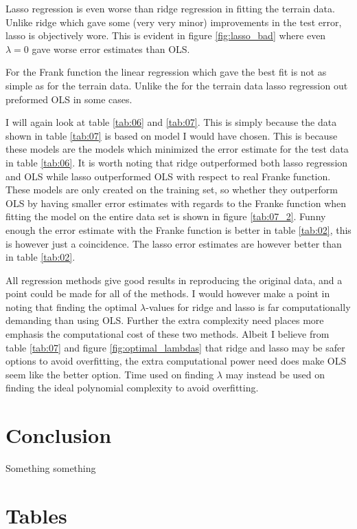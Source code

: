 \documentclass[uio,jmp,amsmath,amssymb,reprint,nofootinbib]{revtex4-1}
\numberwithin{equation}{section}
\begin{document}
Lasso regression is even worse than ridge regression in fitting the terrain data. Unlike ridge which gave some (very very minor) improvements in the test error, lasso is objectively wore. This is evident in figure \ref{fig:lasso_bad} where even \(\lambda = 0\) gave worse error estimates than OLS.

For the Frank function the linear regression which gave the best fit is not as simple as for the terrain data. Unlike the for the terrain data lasso regression out preformed OLS in some cases.

I will again look at table \ref{tab:06} and \ref{tab:07}. This is simply because the data shown in table \ref{tab:07} is based on model I would have chosen. This is because these models are the models which minimized the error estimate for the test data in table \ref{tab:06}. It is worth noting that ridge outperformed both lasso regression and OLS while lasso outperformed OLS with respect to real Franke function. These models are only created on the training set, so whether they outperform OLS by having smaller error estimates with regards to the Franke function when fitting the model on the entire data set is shown in figure \ref{tab:07_2}. Funny enough the error estimate with the Franke function is better in table \ref{tab:02}, this is however just a coincidence. The lasso error estimates are however better than in table \ref{tab:02}.

All regression methods give good results in reproducing the original data, and a point could be made for all of the methods. I would however make a point in noting that finding the optimal \(\lambda\)-values for ridge and lasso is far computationally demanding than using OLS. Further the extra complexity need places more emphasis the computational cost of these two methods. Albeit I believe from table \ref{tab:07} and figure \ref{fig:optimal_lambdas} that ridge and lasso may be safer options to avoid overfitting, the extra computational power need does make OLS seem like the better option. Time used on finding \(\lambda\) may instead be used on finding the ideal polynomial complexity to avoid overfitting.

\section{Conclusion}\label{sec:Conclusion}

Something something


\appendix

\section{Tables}
\end{document}
